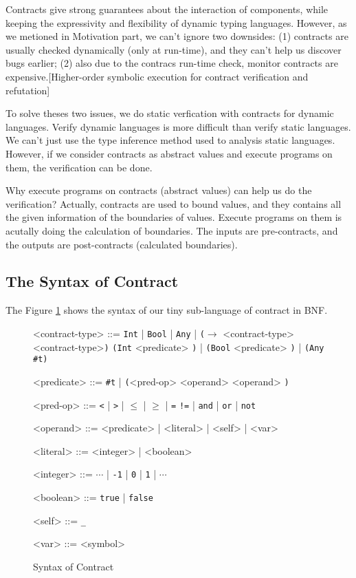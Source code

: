 \documentclass[paper=a4, fontsize=11pt]{scrartcl} %
\numberwithin{equation}{section} %
\numberwithin{figure}{section} %
\numberwithin{table}{section} %
\begin{document}
Contracts give strong guarantees about the interaction of components, while keeping the expressivity and flexibility of dynamic typing languages. However, as we metioned in Motivation part, we can't ignore two downsides: (1) contracts are usually checked dynamically (only at run-time), and they can't help us discover bugs earlier; (2) also due to the contracs run-time check, monitor contracts are expensive.[Higher-order symbolic execution for contract verification and refutation]

To solve theses two issues, we do static verfication with contracts for dynamic languages. Verify dynamic languages is more difficult than verify static languages. We can't just use the type inference method used to analysis static languages. However, if we consider contracts as abstract values and execute programs on them, the verification can be done.

Why execute programs on contracts (abstract values) can help us do the verification? Actually, contracts are used to bound values, and they contains all the given information of the boundaries of values. Execute programs on them is acutally doing the calculation of boundaries. The inputs are pre-contracts, and the outputs are post-contracts (calculated boundaries).

\subsection{The Syntax of Contract}
The Figure \ref{figc} shows the syntax of our tiny sub-language of contract in BNF.
\begin{figure}[h!]
\setlength{\grammarparsep}{7pt plus 1pt minus 1pt} %
\setlength{\grammarindent}{8em} %
\begin{grammar}
<contract-type> ::= \texttt{Int} | \texttt{Bool} | \texttt{Any} | \texttt{($\rightarrow$} <contract-type> <contract-type>\texttt{)}
\alt \texttt{(Int} <predicate> \texttt{)} | \texttt{(Bool} <predicate> \texttt{)} | \texttt{(Any \#t)}

<predicate> ::= \texttt{\#t} | \texttt{(}<pred-op> <operand> <operand> \texttt{)}

<pred-op> ::= \texttt{\textless} | \texttt{\textgreater} | \texttt{$\leq$} | \texttt{$\geq$} | \texttt{=}
\alt \texttt{!=} | \texttt{and} | \texttt{or} | \texttt{not}

<operand> ::= <predicate> | <literal> | <self> | <var>


<literal> ::= <integer> | <boolean>

<integer> ::= $\cdots$ | \texttt{-1} | \texttt{0} | \texttt{1} | $\cdots$

<boolean> ::= \texttt{true} | \texttt{false}

<self> ::= \texttt{_}

<var> ::= <symbol>
\end{grammar}
\caption{Syntax of Contract}
\label{figc}
\end{figure}
\end{document}

